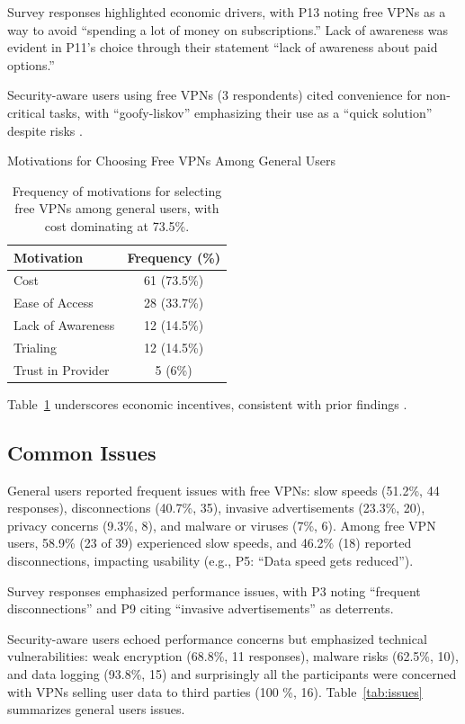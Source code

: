 \documentclass[11pt,a4paper]{article}
\begin{document}
Survey responses highlighted economic drivers, with P13 noting free VPNs as a way to avoid ``spending a lot of money on subscriptions.'' Lack of awareness was evident in P11’s choice through their statement ``lack of awareness about paid options.''

Security-aware users using free VPNs (3 respondents) cited convenience for non-critical tasks, with ``goofy-liskov'' emphasizing their use as a ``quick solution'' despite risks \citep{Shetty2025}.

\begin{table}[ht]
    \centering
    \caption{Motivations for Choosing Free VPNs Among General Users}
    \begin{tabular}{lc}
        \toprule
        \textbf{Motivation} & \textbf{Frequency (\%)} \\
        \midrule
        Cost & 61 (73.5\%) \\
        Ease of Access & 28 (33.7\%) \\
        Lack of Awareness & 12 (14.5\%) \\
        Trialing & 12 (14.5\%) \\
        Trust in Provider & 5 (6\%) \\
        \bottomrule
    \end{tabular}
    \caption*{Frequency of motivations for selecting free VPNs among general users, with cost dominating at 73.5\%.}
    \label{tab:motivations}
\end{table}

Table~\ref{tab:motivations} underscores economic incentives, consistent with prior findings \citep{Namara2020, Sombatruang2020}.

\subsection{Common Issues}
General users reported frequent issues with free VPNs: slow speeds (51.2\%, 44 responses), disconnections (40.7\%, 35), invasive advertisements (23.3\%, 20), privacy concerns (9.3\%, 8), and malware or viruses (7\%, 6). Among free VPN users, 58.9\% (23 of 39) experienced slow speeds, and 46.2\% (18) reported disconnections, impacting usability (e.g., P5: ``Data speed gets reduced'').

Survey responses emphasized performance issues, with P3 noting ``frequent disconnections'' and P9 citing ``invasive advertisements'' as deterrents.

Security-aware users echoed performance concerns but emphasized technical vulnerabilities: weak encryption (68.8\%, 11 responses), malware risks (62.5\%, 10), and data logging (93.8\%, 15) and surprisingly all the participants were concerned with VPNs selling user data to third parties (100 \%, 16)\citep{Shetty2025}. Table~\ref{tab:issues} summarizes general users issues.
\end{document}
